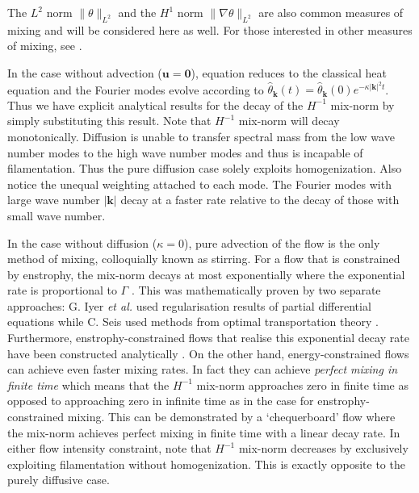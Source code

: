 \documentclass[12pt]{iopart}
\newcommand{\ltwo}[1]{\|#1\|_{L^{2}}}
\newcommand{\hone}[1]{\| \nabla #1\|_{L^{2}}}
\renewcommand{\vec}[1]{\mathbf{#1}}
\begin{document}
The $L^{2}$ norm $\ltwo{\theta}$ and the $H^{1}$ norm $\hone{\theta}$ are also common measures of mixing and will be considered here as well.  For those interested in other measures of mixing, see \cite{JLT2012}. 

In the case without advection ($\vec{u}=\vec{0}$), equation  reduces to the classical heat equation \cite{Evans2010} and the Fourier modes evolve according to $\hat{\theta}_{\vec{k}}(t)=\hat{\theta}_{\vec{k}}(0)e^{-\kappa|\vec{k}|^2t}$. Thus we have explicit analytical results for the decay of the $H^{-1}$ mix-norm by simply substituting this result. Note that $H^{-1}$ mix-norm will decay monotonically. Diffusion is unable to transfer spectral mass from the low wave number modes to the high wave number modes and thus is incapable of filamentation. Thus the pure diffusion case solely exploits homogenization. Also notice the unequal weighting attached to each mode. The Fourier modes with large wave number $|\vec{k}|$ decay at a faster rate relative to the decay of those with small wave number.


In the case without diffusion ($\kappa = 0$), pure advection of the flow is the only method of mixing, colloquially known as stirring. For a flow that is constrained by enstrophy, the mix-norm decays at most exponentially where the exponential rate is proportional to $\Gamma$ \cite{GI2014,CS2013}. This was mathematically proven by two separate approaches: G. Iyer {\it et al.} \cite{GI2014} used regularisation results \cite{Crippa} of partial differential equations  while C. Seis \cite{CS2013} used methods from optimal transportation theory \cite{villani2003topics}. Furthermore, enstrophy-constrained flows that realise this exponential decay rate have been constructed analytically \cite{Alberti2014a}. On the other hand, energy-constrained flows can achieve even faster mixing rates. In fact they can achieve {\it perfect mixing in finite time} which means that the $H^{-1}$ mix-norm approaches zero in finite time as opposed to approaching zero in infinite time as in the case for enstrophy-constrained mixing. This can be demonstrated by a `chequerboard' flow \cite{JMP2012} where the mix-norm achieves perfect mixing in finite time with a linear decay rate.  In either flow intensity constraint, note that $H^{-1}$ mix-norm decreases by exclusively exploiting filamentation without homogenization. This is  exactly opposite to the purely diffusive case.
\end{document}
